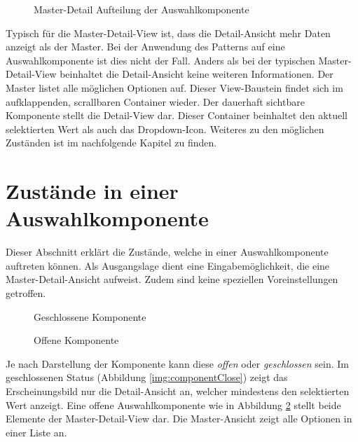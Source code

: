 \begin{figure}[!htb]
    \centering
    \caption{\color{red} Master-Detail Aufteilung der Auswahlkomponente}
    \label{img:masterDetailView}
\end{figure}

Typisch für die Master-Detail-View ist, dass die Detail-Ansicht mehr Daten anzeigt als der Master.
Bei der Anwendung des Patterns auf eine Auswahlkomponente ist dies nicht der Fall.
Anders als bei der typischen Master-Detail-View beinhaltet die Detail-Ansicht keine weiteren Informationen.
Der Master listet alle möglichen Optionen auf.
Dieser View-Baustein findet sich im aufklappenden, scrallbaren Container wieder.
Der dauerhaft sichtbare Komponente stellt die Detail-View dar.
Dieser Container beinhaltet den aktuell selektierten Wert als auch das Dropdown-Icon.
Weiteres zu den möglichen Zuständen ist im nachfolgende Kapitel zu finden.


\section{Zustände in einer Auswahlkomponente}
\label{sec:states}

Dieser Abschnitt erklärt die Zustände, welche in einer Auswahlkomponente auftreten können.
Als Ausgangslage dient eine Eingabemöglichkeit, die eine Master-Detail-Ansicht aufweist.
Zudem sind keine speziellen Voreinstellungen getroffen.

\begin{figure}[!htb]
    \centering
    \begin{minipage}[b]{0.45\textwidth}
        \centering
        \caption{\color{red} Geschlossene Komponente}
        \label{img:componentClose}
    \end{minipage}
    \hfill
    \begin{minipage}[b]{0.45\textwidth}
        \centering
        \caption{\color{red} Offene Komponente}
        \label{img:componentOpen}
    \end{minipage}
\end{figure}

Je nach Darstellung der Komponente kann diese \emph{offen} oder \emph{geschlossen} sein.
Im geschlossenen Status (Abbildung \ref{img:componentClose}) zeigt das Erscheinungsbild nur die Detail-Ansicht an, welcher mindestens den selektierten Wert anzeigt.
Eine offene Auswahlkomponente wie in Abbildung \ref{img:componentOpen} stellt beide Elemente der Master-Detail-View dar.
Die Master-Ansicht zeigt alle Optionen in einer Liste an.


